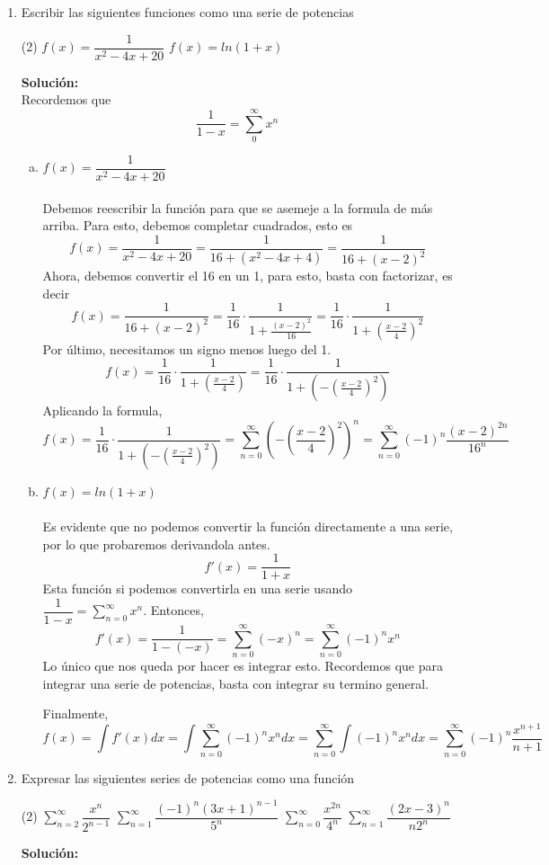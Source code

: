\documentclass[12pt]{article}
\newenvironment{solucion}
{\begin{mdframed}[backgroundcolor=black!10]
		{\bf Solución:}\\
	}
	{
	\end{mdframed}
}
\newenvironment{preguntas}
{\begin{enumerate}\itemsep12pt
	}
	{
	\end{enumerate}
}
\begin{document}
\begin{preguntas}
\item Escribir las siguientes funciones como una serie de potencias
\begin{tasks}(2)
\task $f(x) = \dfrac{1}{x^2-4x+20}$
\task $f(x) = ln(1+x)$
\end{tasks}
\begin{solucion}
Recordemos que $$\dfrac{1}{1-x} = \sum\limits_0^{\infty} x^n$$
\begin{enumerate}[a)]
\item $f(x) = \dfrac{1}{x^2-4x+20}$\\
\\
Debemos reescribir la función para que se asemeje a la formula de más arriba. Para esto, debemos completar cuadrados, esto es
$$f(x) = \dfrac{1}{x^2-4x+20}
= \dfrac{1}{16 + (x^2-4x+4)}
= \dfrac{1}{16 + (x-2)^2}$$
Ahora, debemos convertir el 16 en un 1, para esto, basta con factorizar, es decir
$$ f(x)
= \dfrac{1}{16 + (x-2)^2}
= \dfrac{1}{16}\cdot \dfrac{1}{1 + \frac{(x-2)^2}{16}}
= \dfrac{1}{16} \cdot\dfrac{1}{1 + \left(\frac{x-2}{4}\right)^2}
$$
Por último, necesitamos un signo menos luego del 1.
$$ f(x)
= \dfrac{1}{16} \cdot\dfrac{1}{1 + \left(\frac{x-2}{4}\right)}
= \dfrac{1}{16} \cdot\dfrac{1}{1 + \left(-\left(\frac{x-2}{4}\right)^2\right)}
$$
Aplicando la formula,
$$ f(x)
= \dfrac{1}{16} \cdot\dfrac{1}{1 + \left(-\left(\frac{x-2}{4}\right)^2\right)}
= \sum\limits_{n=0}^{\infty} \left(-\left(\frac{x-2}{4}\right)^2\right)^n
= \sum\limits_{n=0}^{\infty} (-1)^n \dfrac{(x-2)^{2n}}{16^n}
$$
\item $f(x) = ln(1+x)$\\
\\
Es evidente que no podemos convertir la función directamente a una serie, por lo que probaremos derivandola antes.
		$$f'(x) = \dfrac{1}{1+x}$$
		Esta función si podemos convertirla en una serie usando $\dfrac{1}{1-x} = \sum\limits_{n=0}^{\infty} x^n$. Entonces,
		$$f'(x) = \dfrac{1}{1-(-x)} 
		= \sum\limits_{n=0}^{\infty} (-x)^n
		= \sum\limits_{n=0}^{\infty} (-1)^n x^n$$
		Lo único que nos queda por hacer es integrar esto. Recordemos que para integrar una serie de potencias, basta con integrar su termino general.
		
		Finalmente, 
		$$f(x) 
		= \int f'(x) dx
		= \int \sum\limits_{n=0}^{\infty} (-1)^n x^n dx
		= \sum\limits_{n=0}^{\infty} \int (-1)^n x^n dx
		= \sum\limits_{n=0}^{\infty} (-1)^n \dfrac{x^{n+1}}{n+1}$$
\end{enumerate}
\end{solucion}
\item Expresar las siguientes series de potencias como una función
\begin{tasks}(2)
\task $\sum\limits_{n=2}^\infty \dfrac{x^n}{2^{n-1}}$
\task $\sum\limits_{n=1}^\infty \dfrac{(-1)^n (3x+1)^{n-1}}{5^n}$
\task $\sum\limits_{n=0}^\infty \dfrac{x^{2n}}{4^n}$
\task $\sum\limits_{n=1}^\infty \dfrac{(2x-3)^n}{n2^n}$
\end{tasks}
\begin{solucion}


\end{solucion}
\end{preguntas}
\end{document}
